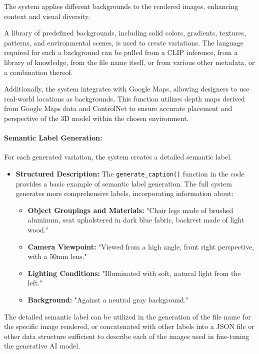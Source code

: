 \documentclass{article}
\begin{document}
The system applies different backgrounds to the rendered images, enhancing context and visual diversity.

A library of predefined backgrounds, including solid colors, gradients, textures, patterns, and environmental scenes, is used to create variations. The language required for such a background can be pulled from a CLIP inference, from a library of knowledge, from the file name itself, or from various other metadata, or a combination thereof.

Additionally, the system integrates with Google Maps, allowing designers to use real-world locations as backgrounds. This function utilizes depth maps derived from Google Maps data and ControlNet to ensure accurate placement and perspective of the 3D model within the chosen environment. 

\paragraph{Semantic Label Generation:} For each generated variation, the system creates a detailed semantic label.

\begin{itemize}
    \item \textbf{Structured Description:} The \texttt{generate\_caption()} function in the code provides a basic example of semantic label generation. The full system generates more comprehensive labels, incorporating information about:
    \begin{itemize}
        \item \textbf{Object Groupings and Materials:} "Chair legs made of brushed aluminum, seat upholstered in dark blue fabric, backrest made of light wood."
        \item \textbf{Camera Viewpoint:} "Viewed from a high angle, front right perspective, with a 50mm lens."
        \item \textbf{Lighting Conditions:} "Illuminated with soft, natural light from the left."
        \item \textbf{Background:} "Against a neutral gray background."
    \end{itemize}
\end{itemize}

The detailed semantic label can be utilized in the generation of the file name for the specific image rendered, or concatenated with other labels into a JSON file or other data structure sufficient to describe each of the images used in fine-tuning the generative AI model. 
\end{document}
